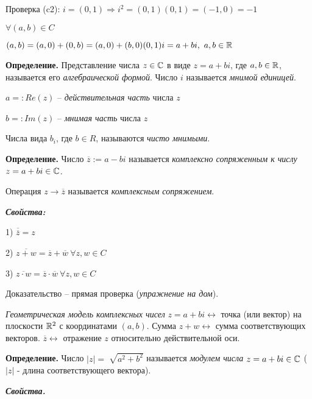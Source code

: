 \vspace{\baselineskip}
Проверка (c2): $i = (0, 1) \Rightarrow i^2 = (0, 1)(0, 1) = (-1, 0) = -1$

$\forall (a, b) \in C$

$(a, b) = (a, 0) + (0, b) = (a, 0) + (b, 0) (0, 1) i = a + bi, \ a, b \in \mathbb{R}$

\vspace{\baselineskip}
\textbf{Определение.} Представление числа $z \in \mathbb{C}$ в виде  $z = a + bi$, где $a, b \in \mathbb{R}$, называется его \textit{алгебраической формой}. Число $i$ называется \textit{мнимой единицей}.

$a =: Re(z)$ -- \textit{действительная часть} числа $z$

$b =: Im(z)$ -- \textit{мнимая часть} числа $z$

\vspace{\baselineskip}
Числа вида $b_i$, где $b \in R$, называются \textit{чисто мнимыми}.

\vspace{\baselineskip}
\textbf{Определение.} Число $\overline{z} := a - bi$ называется \textit{комплексно сопряженным к числу} $z=a+bi \in \mathbb{C}$.

Операция $z \rightarrow \overline{z}$ называется \textit{комплексным сопряжением}.

\vspace{\baselineskip}
\textbf{\textit{Свойства:}}

1) $\overline{\overline{z}} = z$

2) $\overline{z + w} = \overline{z} + \overline{w} \ \forall z, w \in C$

3) $\overline{z \cdot w} = \overline{z} \cdot \overline{w} \ \forall z, w \in C$

Доказательство -- прямая проверка (\textit{упражнение на дом}).

\vspace{\baselineskip}
\textit{Геометрическая модель комплексных чисел} $z = a + bi \leftrightarrow$ точка (или вектор) на плоскости $\mathbb{R}^2$ с координатами $(a, b)$. Сумма $z + w \leftrightarrow$ сумма соответствующих векторов. $\overline{z} \leftrightarrow$ отражение $z$ относительно действительной оси.

\vspace{\baselineskip}
\textbf{Определение.} Число $|z| = \sqrt[]{a^2 + b^2}$ называется \textit{модулем числа} $z = a + bi \in \mathbb{C}$ ($|z|$ - длина соответствующего вектора).

\vspace{\baselineskip}
\textbf{\textit{Свойства.}} 

